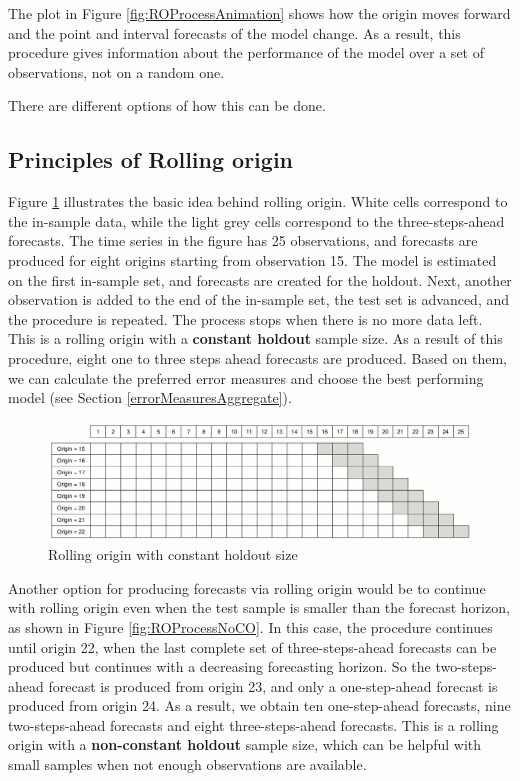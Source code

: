 \documentclass[
]{book}
\theoremstyle{definition}
\theoremstyle{definition}
\theoremstyle{definition}
\theoremstyle{definition}
\theoremstyle{remark}
\begin{document}
The plot in Figure \ref{fig:ROProcessAnimation} shows how the origin moves forward and the point and interval forecasts of the model change. As a result, this procedure gives information about the performance of the model over a set of observations, not on a random one.

There are different options of how this can be done.

\hypertarget{principles-of-rolling-origin}{%
\subsection{Principles of Rolling origin}\label{principles-of-rolling-origin}}

Figure \ref{fig:ROProcessCO} \citep{Svetunkov2017} illustrates the basic idea behind rolling origin. White cells correspond to the in-sample data, while the light grey cells correspond to the three-steps-ahead forecasts. The time series in the figure has 25 observations, and forecasts are produced for eight origins starting from observation 15. The model is estimated on the first in-sample set, and forecasts are created for the holdout. Next, another observation is added to the end of the in-sample set, the test set is advanced, and the procedure is repeated. The process stops when there is no more data left. This is a rolling origin with a \textbf{constant holdout} sample size. As a result of this procedure, eight one to three steps ahead forecasts are produced. Based on them, we can calculate the preferred error measures and choose the best performing model (see Section \ref{errorMeasuresAggregate}).

\begin{figure}
\includegraphics[width=0.75\linewidth]{./images/03-ROProcessCO} \caption{Rolling origin with constant holdout size}\label{fig:ROProcessCO}
\end{figure}

Another option for producing forecasts via rolling origin would be to continue with rolling origin even when the test sample is smaller than the forecast horizon, as shown in Figure \ref{fig:ROProcessNoCO}. In this case, the procedure continues until origin 22, when the last complete set of three-steps-ahead forecasts can be produced but continues with a decreasing forecasting horizon. So the two-steps-ahead forecast is produced from origin 23, and only a one-step-ahead forecast is produced from origin 24. As a result, we obtain ten one-step-ahead forecasts, nine two-steps-ahead forecasts and eight three-steps-ahead forecasts. This is a rolling origin with a \textbf{non-constant holdout} sample size, which can be helpful with small samples when not enough observations are available.
\end{document}
